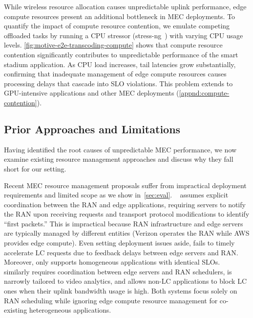 While wireless resource allocation causes unpredictable uplink performance, edge compute resources present an additional bottleneck in MEC deployments.
To quantify the impact of compute resource contention, we emulate competing offloaded tasks by running a CPU stressor (stress-ng~\cite{stress-ng}) with varying CPU usage levels.
\autoref{fig:motive-e2e-transcoding-compute} shows that compute resource contention significantly contributes to unpredictable performance of the smart stadium application.
As CPU load increases, tail latencies grow substantially, confirming that inadequate management of edge compute resources causes processing delays that cascade into SLO violations.
This problem extends to GPU-intensive applications and other MEC deployments (\autoref{appnd:compute-contention}).


\subsection{Prior Approaches and Limitations}
\label{sec:prior}

Having identified the root causes of unpredictable MEC performance, we now examine existing resource management approaches and discuss why they fall short for our setting.

Recent MEC resource management proposals suffer from impractical deployment requirements and limited scope as we show in~\autoref{sec:eval}.
\tutti{}~\cite{xu2022tutti} assumes explicit coordination between the RAN  and edge applications, requiring servers to notify the RAN upon receiving requests and transport protocol modifications to identify ``first packets.''
This is impractical because RAN infrastructure and edge servers are typically managed by different entities (\eg Verizon operates the RAN while AWS provides edge compute).
Even setting deployment issues aside, \tutti{} fails to timely accelerate LC requests due to feedback delays between edge servers and RAN.
Moreover, \tutti{} only supports homogeneous applications with identical SLOs.
\arma{}~\cite{arma:mobisys25} similarly requires coordination between edge servers and RAN schedulers, is narrowly tailored to video analytics, and allows non-LC applications to block LC ones when their uplink bandwidth usage is high.
Both systems focus solely on RAN scheduling while ignoring edge compute resource management for co-existing heterogeneous applications.

